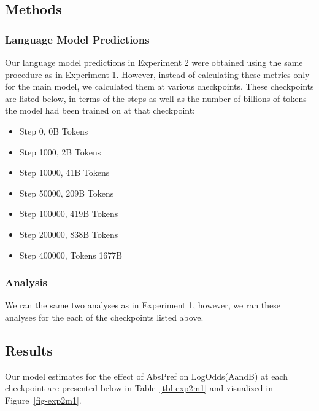 \documentclass[
  10pt,
  nohyperref]{acl}
\begin{document}
\subsection{Methods}\label{methods-1}

\subsubsection{Language Model
Predictions}\label{language-model-predictions-1}

Our language model predictions in Experiment 2 were obtained using the
same procedure as in Experiment 1. However, instead of calculating these
metrics only for the main model, we calculated them at various
checkpoints. These checkpoints are listed below, in terms of the steps
as well as the number of billions of tokens the model had been trained
on at that checkpoint:

\begin{itemize}
\item
  Step 0, 0B Tokens
\item
  Step 1000, 2B Tokens
\item
  Step 10000, 41B Tokens
\item
  Step 50000, 209B Tokens
\item
  Step 100000, 419B Tokens
\item
  Step 200000, 838B Tokens
\item
  Step 400000, Tokens 1677B
\end{itemize}

\subsubsection{Analysis}\label{analysis}

We ran the same two analyses as in Experiment 1, however, we ran these
analyses for the each of the checkpoints listed above.

\subsection{Results}\label{results-1}

Our model estimates for the effect of AbsPref on LogOdds(AandB) at each
checkpoint are presented below in Table~\ref{tbl-exp2m1} and visualized
in Figure~\ref{fig-exp2m1}.
\end{document}
